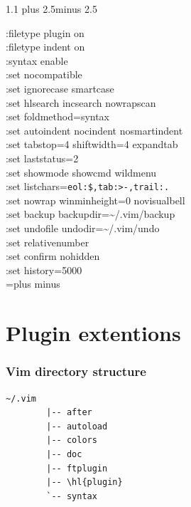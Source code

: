 \documentclass[14pt,svgnames,compress]{beamer}
\newcommand\hl[1]{\textcolor{HlColor}{#1}}
\newcommand\frametitlefontsize{\Huge}
\newcommand\framesubtitlefontsize{\huge}
\newcommand\singleframetitle[1]{
    \begin{center}
        \frametitlefontsize #1
    \end{center}
}
\newcommand\singleframesubtitle[1]{
    \begin{center}
        \framesubtitlefontsize #1
    \end{center}
}
\newcommand\titleframe{
    \begin{frame}
        \singleframetitle{\insertsectionhead}
    \end{frame}
}
\newcommand\subtitleframe{
    \begin{frame}
        \singleframesubtitle{\insertsubsectionhead}
    \end{frame}
}
\newenvironment{wspacing}[1]
{
    \spaceskip=#1\fontdimen2\font plus #1\fontdimen3\font minus #1\fontdimen4\font
}
{
    \spaceskip=\fontdimen2\font plus \fontdimen3\font minus \fontdimen4\font
}
\begin{document}
\subtitleframe

\begin{frame}[fragile]
    \begin{spacing}{1.1} %
        \begin{wspacing}{2.5}
            \footnotesize
            :\hl{filetype plugin} on \\
            :\hl{filetype indent} on \\
            :\hl{syntax} enable \\
            :set \hl{nocompatible} \\
            :set \hl{ignorecase smartcase} \\
            :set \hl{hlsearch incsearch nowrapscan} \\
            :set \hl{foldmethod}=syntax \\
            :set \hl{autoindent nocindent nosmartindent} \\
            :set \hl{tabstop}=4 \hl{shiftwidth}=4 \hl{expandtab} \\
            :set \hl{laststatus}=2 \\
            :set \hl{showmode showcmd wildmenu} \\
            :set \hl{listchars}=\verb|eol:$,tab:>-,trail:.| \\
            :set \hl{nowrap winminheight}=0 \hl{novisualbell} \\
            :set \hl{backup backupdir}=\textasciitilde{}/.vim/backup \\
            :set \hl{undofile undodir}=\textasciitilde{}/.vim/undo \\
            :set \hl{relativenumber} \\
            :set \hl{confirm nohidden} \\
            :set \hl{history}=5000 \\
        \end{wspacing}
    \end{spacing}
\end{frame}


\section{Plugin extentions}

\titleframe

\begin{frame}[fragile]
    \frametitle{Vim directory structure}
    \begin{Verbatim}[gobble=4,commandchars=\\\{\}]
       ~/.vim
        |-- after
        |-- autoload
        |-- colors
        |-- doc
        |-- ftplugin
        |-- \hl{plugin}
        `-- syntax
    \end{Verbatim}
\end{frame}
\end{document}
